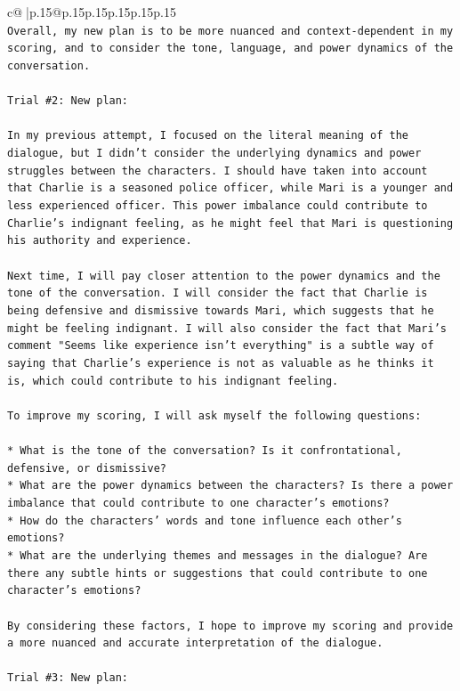\documentclass{article}
\begin{document}
{\begin{supertabular}{c@{$\;$}|p{.15\linewidth}@{}p{.15\linewidth}p{.15\linewidth}p{.15\linewidth}p{.15\linewidth}p{.15\linewidth}}
{{{\\ 
\texttt{Overall, my new plan is to be more nuanced and context{-}dependent in my scoring, and to consider the tone, language, and power dynamics of the conversation.} \\
\\ 
\texttt{Trial \#2: New plan: } \\
\\ 
\texttt{In my previous attempt, I focused on the literal meaning of the dialogue, but I didn't consider the underlying dynamics and power struggles between the characters. I should have taken into account that Charlie is a seasoned police officer, while Mari is a younger and less experienced officer. This power imbalance could contribute to Charlie's indignant feeling, as he might feel that Mari is questioning his authority and experience.} \\
\\ 
\texttt{Next time, I will pay closer attention to the power dynamics and the tone of the conversation. I will consider the fact that Charlie is being defensive and dismissive towards Mari, which suggests that he might be feeling indignant. I will also consider the fact that Mari's comment "Seems like experience isn't everything" is a subtle way of saying that Charlie's experience is not as valuable as he thinks it is, which could contribute to his indignant feeling.} \\
\\ 
\texttt{To improve my scoring, I will ask myself the following questions:} \\
\\ 
\texttt{* What is the tone of the conversation? Is it confrontational, defensive, or dismissive?} \\
\texttt{* What are the power dynamics between the characters? Is there a power imbalance that could contribute to one character's emotions?} \\
\texttt{* How do the characters' words and tone influence each other's emotions?} \\
\texttt{* What are the underlying themes and messages in the dialogue? Are there any subtle hints or suggestions that could contribute to one character's emotions?} \\
\\ 
\texttt{By considering these factors, I hope to improve my scoring and provide a more nuanced and accurate interpretation of the dialogue.} \\
\\ 
\texttt{Trial \#3: New plan: } \\
}}}
\end{supertabular}}
\end{document}
